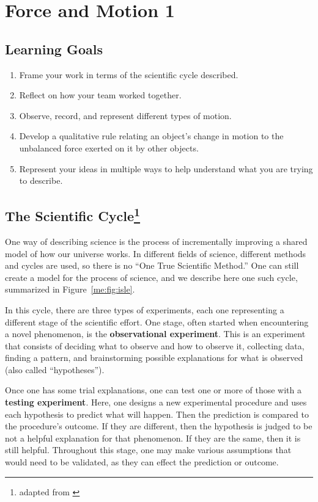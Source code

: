 \chapter{Force and Motion 1}

\section{Learning Goals}

\begin{enumerate}
	\item Frame your work in terms of the scientific cycle described.
	
	\item Reflect on how your team worked together.
	
	\item Observe, record, and represent different types of motion.
	
	\item Develop a qualitative rule relating an object's change in motion to the unbalanced force exerted on it by other objects.
	
	\item Represent your ideas in multiple ways to help understand what you are trying to describe.
\end{enumerate}

\section{The Scientific Cycle\protect\footnote{adapted from \cite{etkina_college_2014}}}

One way of describing science is the process of incrementally improving a shared model of how our universe works. In different fields of science, different methods and cycles are used, so there is no ``One True Scientific Method.'' One can still create a model for the process of science, and we describe here one such cycle, summarized in Figure~\ref{me:fig:isle}.

In this cycle, there are three types of experiments, each one representing a different stage of the scientific effort. One stage, often started when encountering a novel phenomenon, is the \textbf{observational experiment}. This is an experiment that consists of deciding what to observe and how to observe it, collecting data, finding a pattern, and brainstorming possible explanations for what is observed (also called ``hypotheses'').

Once one has some trial explanations, one can test one or more of those with a \textbf{testing experiment}. Here, one designs a new experimental procedure and uses each hypothesis to predict what will happen. Then the prediction is compared to the procedure's outcome. If they are different, then the hypothesis is judged to be not a helpful explanation for that phenomenon. If they are the same, then it is still helpful. Throughout this stage, one may make various assumptions that would need to be validated, as they can effect the prediction or outcome.

